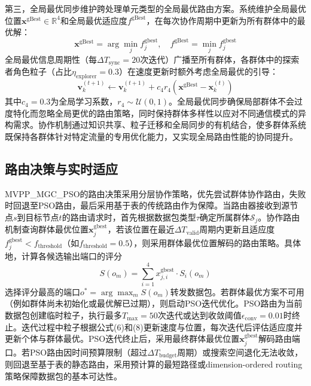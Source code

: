 \documentclass[11pt,a4paper]{article}
\begin{document}
第三，全局最优同步维护跨处理单元类型的全局最优路由方案。系统维护全局最优位置$\mathbf{x}^{\text{gBest}} \in \mathbb{R}^4$和全局最优适应度$f^{\text{gBest}}$，在每次协作周期中更新为所有群体中的最优解：
\begin{equation}
\mathbf{x}^{\text{gBest}} = \arg\min_{j} f_j^{\text{gbest}}, \quad f^{\text{gBest}} = \min_{j} f_j^{\text{gbest}}
\end{equation}
全局最优信息周期性（每$\Delta T_{\text{sync}} = 20$次迭代）广播至所有群体，各群体中的探索者角色粒子（占比$\eta_{\text{explorer}} = 0.3$）在速度更新时额外考虑全局最优的引导：
\begin{equation}
\mathbf{v}_k^{(t+1)} \leftarrow \mathbf{v}_k^{(t+1)} + c_4 r_4 (\mathbf{x}^{\text{gBest}} - \mathbf{x}_k^{(t)})
\end{equation}
其中$c_4 = 0.3$为全局学习系数，$r_4 \sim \mathcal{U}(0, 1)$。全局最优同步确保局部群体不会过度特化而忽略全局更优的路由策略，同时保持群体多样性以应对不同通信模式的异构需求。协作机制通过知识共享、粒子迁移和全局同步的有机结合，使多群体系统既保持各群体针对特定流量的专用优化能力，又实现全局路由性能的协同提升。

\subsection{路由决策与实时适应}

MVPP\_MGC\_PSO的路由决策采用分层协作策略，优先尝试群体协作路由，失败时回退至PSO路由，最后采用基于表的传统路由作为保障。当路由器接收到源节点$s$到目标节点$t$的路由请求时，首先根据数据包类型$\tau$确定所属群体$\mathcal{S}_j$。协作路由机制查询群体最优位置$\mathbf{x}_j^{\text{gbest}}$，若该位置在最近$\Delta T_{\text{valid}}$周期内更新且适应度$f_j^{\text{gbest}} < f_{\text{threshold}}$（如$f_{\text{threshold}} = 0.5$），则采用群体最优位置解码的路由策略。具体地，计算各候选输出端口的评分
\begin{equation}
S(o_m) = \sum_{i=1}^4 x_{j,i}^{\text{gbest}} \cdot S_i(o_m)
\end{equation}
选择评分最高的端口$o^* = \arg\max_m S(o_m)$转发数据包。若群体最优方案不可用（例如群体尚未初始化或最优解已过期），则启动PSO迭代优化。PSO路由为当前数据包创建临时粒子，执行最多$T_{\max} = 50$次迭代或达到收敛阈值$\epsilon_{\text{conv}} = 0.01$时终止。迭代过程中粒子根据公式(6)和(8)更新速度与位置，每次迭代后评估适应度并更新个体与群体最优。PSO迭代终止后，采用最终群体最优位置$\mathbf{x}_j^{\text{gbest}}$解码路由端口。若PSO路由因时间预算限制（超过$\Delta T_{\text{budget}}$周期）或搜索空间退化无法收敛，则回退至基于表的静态路由，采用预计算的最短路径或dimension-ordered routing策略保障数据包的基本可达性。
\end{document}
